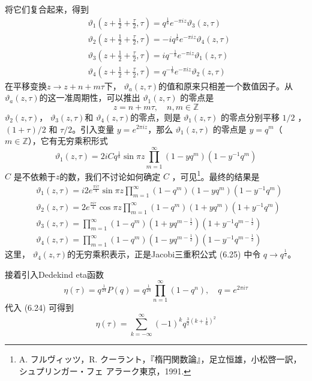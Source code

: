 将它们复合起来，得到
\begin{align} &\vartheta_{1}\left(z+\frac{1}{2}+\frac{\tau}{2}, \tau\right)=q^{\frac{1}{8}} e^{-\pi i z} \vartheta_{3}(z, \tau) \\ &\vartheta_{2}\left(z+\frac{1}{2}+\frac{\tau}{2}, \tau\right)=-i q^{\frac{1}{8}} e^{-\pi i z} \vartheta_{4}(z, \tau) \\ &\vartheta_{3}\left(z+\frac{1}{2}+\frac{\tau}{2}, \tau\right)=i q^{-\frac{1}{8}} e^{-\pi i z} \vartheta_{1}(z, \tau) \\ &\vartheta_{4}\left(z+\frac{1}{2}+\frac{\tau}{2}, \tau\right)=q^{-\frac{1}{8}} e^{-\pi i z} \vartheta_{2}(z, \tau) \end{align}
在平移变换$ z \rightarrow z+n+m \tau $下， $\vartheta_{a}(z, \tau) $的值和原来只相差一个数值因子。从 $\vartheta_{a}(z, \tau) $的这一准周期性，可以推出 $\vartheta_{1}(z, \tau)$ 的零点是
$$
z=n+m \tau, \quad n, m \in \mathbb{Z}
$$
$\vartheta_{2}(z, \tau) $， $\vartheta_{3}(z, \tau) $和 $\vartheta_{4}(z, \tau) $的零点，则是 $\vartheta_{1}(z, \tau)$ 的零点分别平移 $1/2$ ， $(1+\tau)/2$ 和 $\tau/2 $。引入变量 $y=e^{2 \pi i z} $，那么 $\vartheta_{1}(z, \tau)$ 的零点是 $y=q^{m} $（ $m\in \mathbb{Z} $），它有无穷乘积形式
$$
\vartheta_{1}(z, \tau)=2 i C q^{\frac{1}{8}} \sin \pi z \prod_{m=1}^\infty\left(1-y q^{m}\right)\left(1-y^{-1} q^{m}\right)
$$
$C$ 是不依赖于$ z $的数，我们不讨论如何确定 $C$ ，可见\footnote{A. フルヴィッツ，R. クーラント，『楕円関数論』，足立恒雄，小松啓一訳，シュプリンガー・フェ アラーク東京，1991.}。最终的结果是
\begin{align} &\vartheta_{1}(z, \tau)=i 2 e^{\frac{\pi i \tau}{4}} \sin \pi z \prod_{m=1}^{\infty}\left(1-q^{m}\right)\left(1-y q^{m}\right)\left(1-y^{-1} q^{m}\right) \\ &\vartheta_{2}(z, \tau)=2 e^{\frac{\pi i \tau}{4}} \cos \pi z \prod_{m=1}^{\infty}\left(1-q^{m}\right)\left(1+y q^{m}\right)\left(1+y^{-1} q^{m}\right) \\ &\vartheta_{3}(z, \tau)=\prod_{m=1}^{\infty}\left(1-q^{m}\right) (1+y q^{m-\frac{1}{2}} ) (1+y^{-1} q^{m-\frac{1}{2}} ) \\ &\vartheta_{4}(z, \tau)=\prod_{m=1}^{\infty}\left(1-q^{m}\right) (1-y q^{m-\frac{1}{2}}) (1-y^{-1} q^{m-\frac{1}{2}} ) \end{align}
这里， $\vartheta_{4}(z, \tau) $的无穷乘积表示，正是Jacobi三重积公式 (6.25) 中令 $q \rightarrow q^{\frac{1}{2}} $。

接着引入Dedekind eta函数
\begin{equation}
	\eta(\tau)=q^{\frac{1}{24}} P(q)=q^{\frac{1}{24}} \prod_{n=1}^{\infty}\left(1-q^{n}\right), \quad q=e^{2 \pi i \tau}
\end{equation} 
代入 (6.24) 可得到
\begin{equation}
	\eta(\tau)=\sum_{k=-\infty}^{\infty}(-1)^{k} q^{\frac{3}{2}\left(k+\frac{1}{6}\right)^{2}}
\end{equation} 

